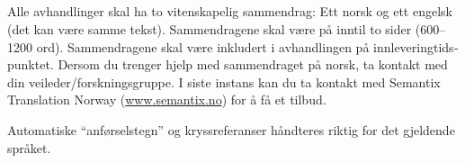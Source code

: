 \begin{otherlanguage}{norsk}
\chapter{\abstractname}

Alle avhandlinger skal ha to vitenskapelig sammendrag:
Ett norsk og ett engelsk (det kan være samme tekst).
Sammendragene skal være på inntil to sider (600--1200 ord).
Sammendragene skal være inkludert i avhandlingen på innleveringtidspunktet.
Dersom du trenger hjelp med sammendraget på norsk, ta kontakt med din veileder/forskningsgruppe.
I siste instans kan du ta kontakt med Semantix Translation Norway (\url{www.semantix.no}) for å få et tilbud.

Automatiske \enquote{anførselstegn} og kryssreferanser håndteres riktig for det gjeldende språket.


\end{otherlanguage}